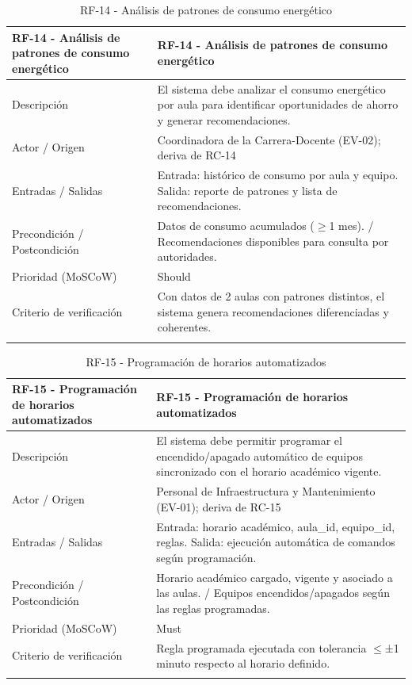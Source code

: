 \begingroup
\small
\begin{longtable}{|p{7.8cm}|p{7.8cm}|}
\hline
RF-14 - Análisis de patrones de consumo energético & RF-14 - Análisis de patrones de consumo energético \\ \hline
Descripción & El sistema debe analizar el consumo energético por aula para identificar oportunidades de ahorro y generar recomendaciones. \\ \hline
Actor / Origen & Coordinadora de la Carrera-Docente (EV-02); deriva de RC-14 \\ \hline
Entradas / Salidas & Entrada: histórico de consumo por aula y equipo. Salida: reporte de patrones y lista de recomendaciones. \\ \hline
Precondición / Postcondición & Datos de consumo acumulados ($\geq$1 mes). / Recomendaciones disponibles para consulta por autoridades. \\ \hline
Prioridad (MoSCoW) & Should \\ \hline
Criterio de verificación & Con datos de 2 aulas con patrones distintos, el sistema genera recomendaciones diferenciadas y coherentes. \\ \hline
\caption{RF-14 - Análisis de patrones de consumo energético}
\end{longtable}
\endgroup

\begingroup
\small
\begin{longtable}{|p{7.8cm}|p{7.8cm}|}
\hline
RF-15 - Programación de horarios automatizados & RF-15 - Programación de horarios automatizados \\ \hline
Descripción & El sistema debe permitir programar el encendido/apagado automático de equipos sincronizado con el horario académico vigente. \\ \hline
Actor / Origen & Personal de Infraestructura y Mantenimiento (EV-01); deriva de RC-15 \\ \hline
Entradas / Salidas & Entrada: horario académico, aula\_id, equipo\_id, reglas. Salida: ejecución automática de comandos según programación. \\ \hline
Precondición / Postcondición & Horario académico cargado, vigente y asociado a las aulas. / Equipos encendidos/apagados según las reglas programadas. \\ \hline
Prioridad (MoSCoW) & Must \\ \hline
Criterio de verificación & Regla programada ejecutada con tolerancia $\leq$±1 minuto respecto al horario definido. \\ \hline
\caption{RF-15 - Programación de horarios automatizados}
\end{longtable}
\endgroup

